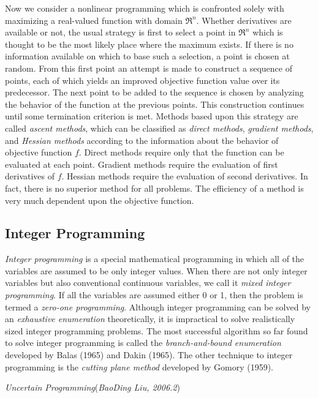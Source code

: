 Now we consider a nonlinear programming which is confronted solely with
maximizing a real-valued function with domain $\Re^n$.  Whether derivatives are
available or not, the usual strategy is first to select a point in $\Re^n$ which
is thought to be the most likely place where the maximum exists. If there is no
information available on which to base such a selection, a point is chosen at
random. From this first point an attempt is made to construct a sequence of
points, each of which yields an improved objective function value over its
predecessor. The next point to be added to the sequence is chosen by analyzing
the behavior of the function at the previous points. This construction continues
until some termination criterion is met. Methods based upon this strategy are
called {\em ascent methods}, which can be classified as {\em direct methods},
{\em gradient methods}, and {\em Hessian methods} according to the information
about the behavior of objective function $f$. Direct methods require only that
the function can be evaluated at each point. Gradient methods require the
evaluation of first derivatives of $f$. Hessian methods require the evaluation
of second derivatives. In fact, there is no superior method for all
problems. The efficiency of a method is very much dependent upon the objective
function.

\subsection{Integer Programming}

{\em Integer programming} is a special mathematical programming in which all of
the variables are assumed to be only integer values. When there are not only
integer variables but also conventional continuous variables, we call it {\em
  mixed integer programming}. If all the variables are assumed either 0 or 1,
then the problem is termed a {\em zero-one programming}. Although integer
programming can be solved by an {\em exhaustive enumeration} theoretically, it
is impractical to solve realistically sized integer programming problems. The
most successful algorithm so far found to solve integer programming is called
the {\em branch-and-bound enumeration} developed by Balas (1965) and Dakin
(1965). The other technique to integer programming is the {\em cutting plane
  method} developed by Gomory (1959).

\hfill\textit{Uncertain Programming\/}\quad(\textsl{BaoDing Liu, 2006.2})

